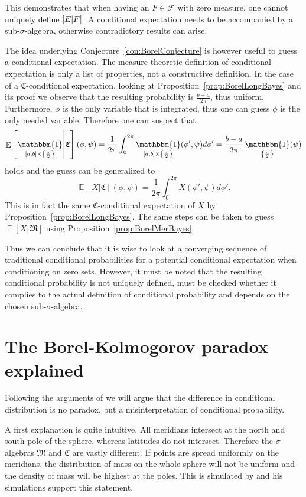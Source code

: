 \documentclass[a4paper]{report}
\theoremstyle{plain}
\theoremstyle{definition}
\theoremstyle{remark}
\numberwithin{equation}{chapter}
\let\P\relax
\DeclareMathOperator{\P}{\mathbb{P}}
\DeclareMathOperator{\E}{\mathbb{E}}
\DeclareMathOperator{\1}{\mathbbm{1}}
\newcommand{\F}{\mathcal{F}}
\begin{document}
This demonstrates that when having an $F\in\F$ with zero measure, one cannot uniquely define $\P[E|F]$. A conditional expectation needs to be accompanied by a sub-$\sigma$-algebra, otherwise contradictory results can arise.

The idea underlying Conjecture~\ref{con:BorelConjecture} is however useful to guess a conditional expectation. The measure-theoretic definition of conditional expectation is only a list of properties, not a constructive definition. In the case of a $\mathfrak{C}$-conditional expectation, looking at Proposition~\ref{prop:BorelLongBayes} and its proof we observe that the resulting probability is $\frac{b-a}{2\pi}$, thus uniform. Furthermore, $\phi$ is the only variable that is integrated, thus one can guess $\phi$ is the only needed variable. Therefore one can suspect that
\begin{equation}
\E\left[\1_{[a,b]\times\left\{\frac{\pi}{2}\right\}}\middle|\mathfrak{C}\right](\phi,\psi)=\frac{1}{2\pi}\int_0^{2\pi}\1_{[a,b]\times\left\{\frac{\pi}{2}\right\}}(\phi',\psi)d\phi'=\frac{b-a}{2\pi}\1_{\left\{\frac{\pi}{2}\right\}}(\psi)
\end{equation}
holds and the guess can be generalized to
\begin{equation}
\E[X|\mathfrak{C}](\phi,\psi)=\frac{1}{2\pi}\int_0^{2\pi}X(\phi',\psi)d\phi'.
\end{equation}
This is in fact the same $\mathfrak{C}$-conditional expectation of $X$ by Proposition~\ref{prop:BorelLongBayes}. The same steps can be taken to guess $\E[X|\mathfrak{M}]$ using Proposition~\ref{prop:BorelMerBayes}. 

Thus we can conclude that it is wise to look at a converging sequence of traditional conditional probabilities for a potential conditional expectation when conditioning on zero sets. However, it must be noted that the resulting conditional probability is not uniquely defined, must be checked whether it complies to the actual definition of conditional probability and depends on the chosen sub-$\sigma$-algebra.

\section{The Borel-Kolmogorov paradox explained}\label{sec:BorelExplained}
Following the arguments of \cite{Gyenis17} we will argue that the difference in conditional distribution is no paradox, but a misinterpretation of conditional probability.

A first explanation is quite intuitive. All meridians intersect at the north and south pole of the sphere, whereas latitudes do not intersect. Therefore the $\sigma$-algebras $\mathfrak{M}$ and $\mathfrak{C}$ are vastly different. If points are spread uniformly on the meridians, the distribution of mass on the whole sphere will not be uniform and the density of mass will be highest at the poles. This is simulated by \cite{Weisstein} and his simulations support this statement.
\end{document}
